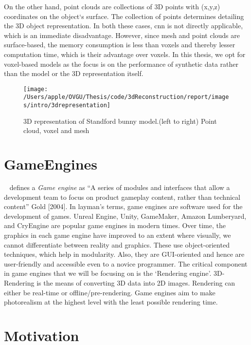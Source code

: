 On the other hand, point clouds are collections of 3D points with (x,y,z) coordinates on the object`s surface.
The collection of points determines detailing the 3D object representation.
In both these cases, \gls{cnn} is not directly applicable, which is an immediate disadvantage.
However, since mesh and point clouds are surface-based, the memory consumption is less than voxels and thereby lesser computation time, which is their advantage over voxels.
In this thesis, we opt for voxel-based models as the focus is on the performance of synthetic data rather than the model or the 3D representation itself.

\begin{figure}
    \centering
    \texttt{[image: /Users/apple/OVGU/Thesis/code/3dReconstruction/report/images/intro/3drepresentation]}
    \caption[Types of 3D Representations]{3D representation of Standford bunny model.(left to right) Point cloud, voxel and mesh~\cite{Hoang2019ADL}
    \label{fig:3d representation}}
\end{figure}

\section{GameEngines}\label{sec:gameengines}
~\cite{Ee2005} defines a \emph{Game engine} as  “A series of modules and interfaces that allow a development team to focus on product gameplay content,
rather than technical content” Gold [2004].
In layman’s terms, game engines are software used for the development of games.
Unreal Engine, Unity, GameMaker, Amazon Lumberyard, and CryEngine are popular game engines in modern times.
Over time, the graphics in each game engine have improved to an extent where visually, we cannot differentiate between reality and graphics.
These use object-oriented techniques, which help in modularity.
Also, they are GUI-oriented and hence are user-friendly and accessible even to a novice programmer.
The critical component in game engines that we will be focusing on is the `Rendering engine’.
3D-Rendering is the means of converting 3D data into 2D images.
Rendering can either be real-time or offline/pre-rendering.
Game engines aim to make photorealism at the highest level with the least possible rendering time.


\section{Motivation}\label{sec:Background and motivation}

